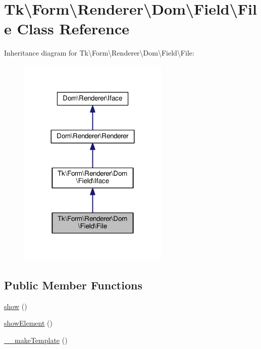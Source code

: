 \hypertarget{classTk_1_1Form_1_1Renderer_1_1Dom_1_1Field_1_1File}{\section{Tk\textbackslash{}Form\textbackslash{}Renderer\textbackslash{}Dom\textbackslash{}Field\textbackslash{}File Class Reference}
\label{classTk_1_1Form_1_1Renderer_1_1Dom_1_1Field_1_1File}
}


Inheritance diagram for Tk\textbackslash{}Form\textbackslash{}Renderer\textbackslash{}Dom\textbackslash{}Field\textbackslash{}File\+:\nopagebreak
\begin{figure}[H]
\begin{center}
\leavevmode
\includegraphics[width=203pt]{classTk_1_1Form_1_1Renderer_1_1Dom_1_1Field_1_1File__inherit__graph}
\end{center}
\end{figure}
\subsection*{Public Member Functions}
\begin{DoxyCompactItemize}
\item 
\hyperlink{classTk_1_1Form_1_1Renderer_1_1Dom_1_1Field_1_1File_adc2d7a4f70c408469660a243ec791acc}{show} ()
\item 
\hyperlink{classTk_1_1Form_1_1Renderer_1_1Dom_1_1Field_1_1File_a4215918ec6cfc443a79c6056e202bbfc}{show\+Element} ()
\item 
\hyperlink{classTk_1_1Form_1_1Renderer_1_1Dom_1_1Field_1_1File_a8a3d2814b6bac7136df9e0ffbc868f7a}{\+\_\+\+\_\+make\+Template} ()
\end{DoxyCompactItemize}
